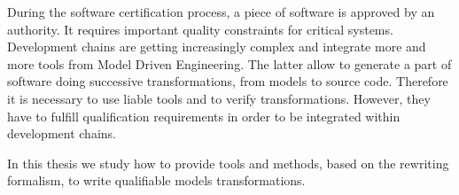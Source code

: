 \begin{ThesisAbstract}
\begin{EnglishAbstract}
\begin{spacing}{0.95}
%
%
%

During the software certification process, a piece of software is approved by
an authority. It requires important quality constraints for critical systems.
Development chains are getting increasingly complex and integrate more and more
tools from Model Driven Engineering. The latter allow to generate a part of
software doing successive transformations, from models to source code.
Therefore it is necessary to use liable tools and to verify transformations.
However, they have to fulfill qualification requirements in order to be
integrated within development chains.

In this thesis we study how to provide tools and methods, based on the
rewriting formalism, to write qualifiable models transformations.


\end{spacing}
\end{EnglishAbstract}
\end{ThesisAbstract}
